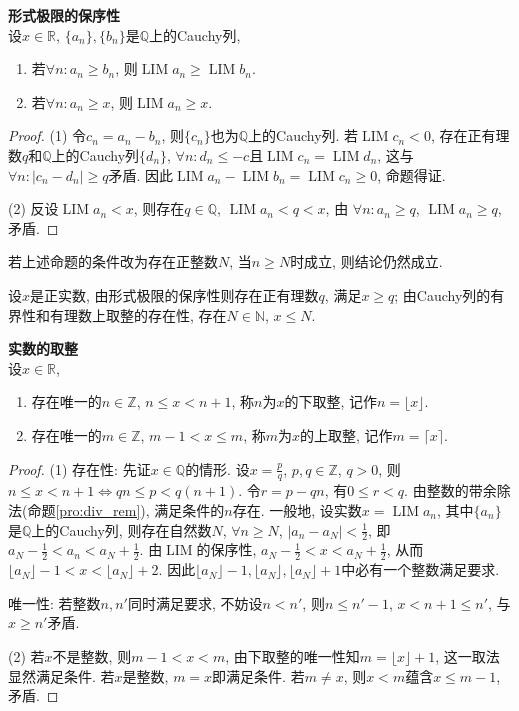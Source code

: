 \begin{lem}\textbf{形式极限的保序性}\\
设$x\in \mathbb{R}$, $\{a_n\}, \{b_n\}$是$\mathbb{Q}$上的Cauchy列,
\begin{enumerate}
\item 若$\forall n: a_n\ge b_n$, 则$\operatorname{LIM} a_n \ge \operatorname{LIM} b_n$.
\item 若$\forall n: a_n\ge x$, 则$\operatorname{LIM} a_n \ge x$. 
\end{enumerate}
\label{lem:formal_limit_preserves_order}
\end{lem}
\begin{proof}
\par (1) 令$c_n=a_n-b_n$, 则$\{c_n\}$也为$\mathbb{Q}$上的Cauchy列. 若$\operatorname{LIM} c_n < 0$, 存在正有理数$q$和$\mathbb{Q}$上的Cauchy列$\{d_n\}$, $\forall n:d_n\le -c$且$\operatorname{LIM} c_n= \operatorname{LIM} d_n$, 这与$\forall n: |c_n-d_n|\ge q$矛盾. 因此$\operatorname{LIM} a_n -\operatorname{LIM} b_n = \operatorname{LIM} c_n \ge 0$, 命题得证. 
\par (2) 反设$\operatorname{LIM} a_n<x$, 则存在$q\in \mathbb{Q}$, $\operatorname{LIM} a_n<q<x$, 由
$\forall n: a_n\ge q$, $\operatorname{LIM} a_n\ge q$, 矛盾.
\end{proof}
若上述命题的条件改为存在正整数$N$, 当$n\ge N$时成立, 则结论仍然成立. 
\par 设$x$是正实数, 由形式极限的保序性则存在正有理数$q$, 满足$x\ge q$; 由Cauchy列的有界性和有理数上取整的存在性, 存在$N\in \mathbb{N}$, $x\le N$. 

\begin{pro} \textbf{实数的取整}\\
设$x\in \mathbb{R}$,
\begin{enumerate}
\item 存在唯一的$n\in\mathbb{Z}$, $n\le x < n+1$, 称$n$为$x$的下取整, 记作$n=\lfloor x\rfloor$. 
\item 存在唯一的$m\in\mathbb{Z}$, $m-1< x \le m$, 称$m$为$x$的上取整, 记作$m=\lceil x\rceil$. 
\end{enumerate}
\end{pro}
\begin{proof}(1) 存在性: 先证$x\in \mathbb{Q}$的情形. 设$x=\frac{p}{q}$, $p,q\in \mathbb{Z}$, $q>0$, 则$n\le x < n+1 \iff qn\le p < q(n+1)$. 令$r=p-qn$, 有$0\le r< q$. 由整数的带余除法(命题\ref{pro:div_rem}), 满足条件的$n$存在. 一般地, 设实数$x=\operatorname{LIM}a_n$, 其中$\{a_n\}$是$\mathbb{Q}$上的Cauchy列, 则存在自然数$N$, $\forall n\ge N$, $|a_n-a_N|< \frac{1}{2}$, 即$a_N-\frac{1}{2}<a_n<a_N+\frac{1}{2}$. 由$\operatorname{LIM}$的保序性, $a_N-\frac{1}{2}<x<a_N+\frac{1}{2}$, 从而$\lfloor a_N \rfloor -1 < x < \lfloor a_N \rfloor+ 2$. 因此$\lfloor a_N \rfloor -1, \lfloor a_N \rfloor, \lfloor a_N \rfloor+1$中必有一个整数满足要求. 
\par 唯一性: 若整数$n,n'$同时满足要求, 不妨设$n<n'$, 则$n\le n'-1$, $x<n+1\le n'$, 与$x\ge n'$矛盾. 
\par (2) 若$x$不是整数, 则$m-1<x<m$, 由下取整的唯一性知$m=\lfloor x \rfloor+1$, 这一取法显然满足条件. 若$x$是整数, $m=x$即满足条件. 若$m\neq x$, 则$x<m$蕴含$x\le m-1$, 矛盾.  
\end{proof}

